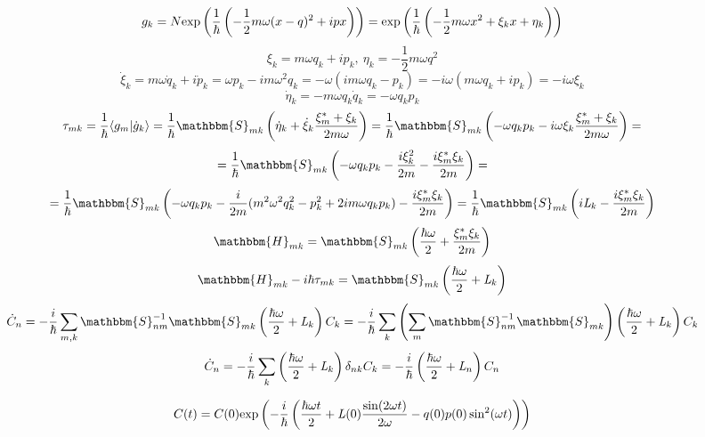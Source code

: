 $$g_k=N\myexp{\frac{1}{\hbar}\left(-\frac{1}{2}m\omega(x-q)^2+ipx\right)}=%
       \myexp{\frac{1}{\hbar}\left(-\frac{1}{2}m\omega x^2 + \xi_kx + \eta_k\right)}$$
$$\xi_k=m\omega q_k+ip_k,\ \eta_k=-\frac{1}{2}m\omega q^2$$
$$\dot{\xi}_k=m\omega\dot{q}_k+i\dot{p}_k=\omega p_k-im\omega^2q_k=-\omega(im\omega q_k - p_k)=-i\omega(m\omega q_k+ip_k)=-i\omega\xi_k$$
$$\dot{\eta}_k=-m\omega q_k\dot{q}_k=-\omega q_kp_k$$
$$\tau_{mk}=\frac{1}{\hbar}\myint{g_m}{\dot{g}_k}=%
				   \frac{1}{\hbar}\mathbbm{S}_{mk}\left(\dot{\eta}_k+\dot{\xi}_k\frac{\xi_m^*+\xi_k}{2m\omega}\right)=%
				   \frac{1}{\hbar}\mathbbm{S}_{mk}\left(-\omega q_kp_k-i\omega\xi_k\frac{\xi_m^*+\xi_k}{2m\omega}\right)=$$
$$=\frac{1}{\hbar}\mathbbm{S}_{mk}\left(-\omega q_kp_k-\frac{i\xi_k^2}{2m}-\frac{i\xi_m^*\xi_k}{2m}\right)=$$
$$=\frac{1}{\hbar}\mathbbm{S}_{mk}\left(-\omega q_kp_k-\frac{i}{2m}(m^2\omega^2q_k^2-p_k^2+2im\omega q_kp_k)-%
					 \frac{i\xi_m^*\xi_k}{2m}\right)=%
\frac{1}{\hbar}\mathbbm{S}_{mk}\left(i\myl_k-\frac{i\xi_m^*\xi_k}{2m}\right)$$
$$\mathbbm{H}_{mk}=\mathbbm{S}_{mk}\left(\frac{\hbar\omega}{2}+\frac{\xi_m^*\xi_k}{2m}\right)$$
$$\mathbbm{H}_{mk}-i\hbar\tau_{mk}=\mathbbm{S}_{mk}\left(\frac{\hbar\omega}{2}+\myl_k\right)$$
$$\dot{C}_n=-\frac{i}{\hbar}\sum_{m,k}\mathbbm{S}_{nm}^{-1}\mathbbm{S}_{mk}\left(\frac{\hbar\omega}{2}+\myl_k\right)C_k=%
	    -\frac{i}{\hbar}\sum_k\left(\sum_m\mathbbm{S}_{nm}^{-1}\mathbbm{S}_{mk}\right)%
				  \left(\frac{\hbar\omega}{2}+\myl_k\right)C_k$$
$$\dot{C}_n=-\frac{i}{\hbar}\sum_k\left(\frac{\hbar\omega}{2}+\myl_k\right)\delta_{nk}C_k=%
	    -\frac{i}{\hbar}\left(\frac{\hbar\omega}{2}+\myl_n\right)C_n$$

\begin{equation}
C(t)=C(0)\text{exp}\left( -\frac{i}{\hbar}\left(\frac{\hbar\omega t}{2}+\mathit{L}(0)\frac{\sin(2\omega t)}{2\omega}-q(0)p(0)\sin^2(\omega t)\right) \right)
\label{eq:coeff}
\end{equation}
